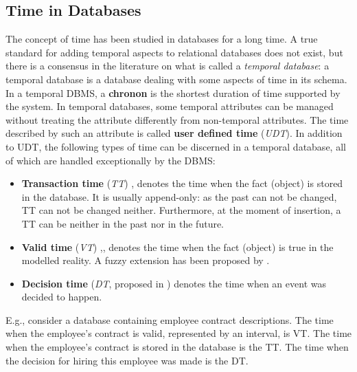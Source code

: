 %
%
\subsection{\label{subsec:time-in-databases}Time in Databases}
The concept of time has been studied in databases for a long time. A true standard for adding temporal aspects to relational databases does not exist, but there is a consensus in the literature \cite{Dyreson1994} on what is called a \emph{temporal database}: a temporal database is a database dealing with some aspects of time in its schema.
In a temporal DBMS, a \textbf{chronon} is the shortest duration of time supported by the system. In temporal databases, some temporal attributes can be managed without treating the attribute differently from non-temporal attributes. The time described by such an attribute is called \textbf{user defined time} (\emph{UDT}). In addition to UDT, the following types of time can be discerned in a temporal database, all of which are handled exceptionally by the DBMS:

\begin{itemize}
	\item
	\textbf{Transaction time} (\emph{TT}) \cite{Rowe1987},\cite{Jensen1991} denotes the time when the fact (object) is stored in the database. It is usually append-only: as the past can not be changed, TT can not be changed neither. Furthermore, at the moment of insertion, a TT can be neither in the past nor in the future.
	\item
	\textbf{Valid time} (\emph{VT}) \cite{Jensen1994},\cite{Sarda1990},\cite{McKenzie1981} denotes the time when the fact (object) is true in the modelled reality. A fuzzy extension has been proposed by \cite{Garrido2009}. 
	\item
	\textbf{Decision time} (\emph{DT}, proposed in \cite{Nascimento1995}) denotes the time when an event was decided to happen. 
	\end{itemize}
	
	E.g., consider a database containing employee contract descriptions. The time when the employee's contract is valid, represented by an interval, is VT. The time when the employee's contract is stored in the database is the TT. The time when the decision for hiring this employee was made is the DT.

